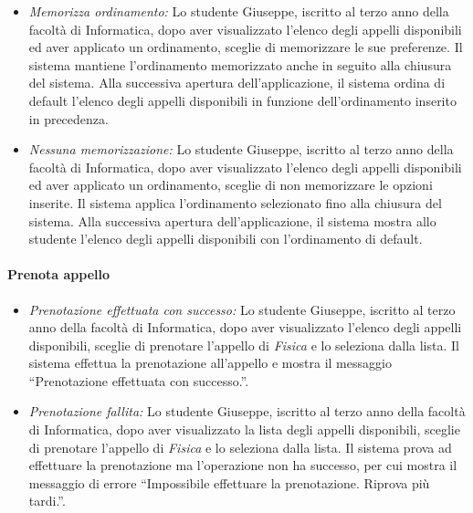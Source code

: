 \begin{itemize}
	\item \textit{Memorizza ordinamento:}
	Lo studente Giuseppe, iscritto al terzo anno della facoltà di Informatica, dopo aver visualizzato l’elenco degli appelli disponibili ed aver applicato un ordinamento, sceglie di memorizzare le sue preferenze. Il sistema mantiene l’ordinamento memorizzato anche in seguito alla chiusura del sistema. Alla successiva apertura dell’applicazione, il sistema ordina di default l’elenco degli appelli disponibili in funzione dell'ordinamento inserito in precedenza.
	
	\item \textit{Nessuna memorizzazione:}
	Lo studente Giuseppe, iscritto al terzo anno della facoltà di Informatica, dopo aver visualizzato l’elenco degli appelli disponibili ed aver applicato un ordinamento, sceglie di non memorizzare le opzioni inserite. Il sistema applica l’ordinamento selezionato fino alla chiusura del sistema. Alla successiva apertura dell'applicazione, il sistema mostra allo studente l’elenco degli appelli disponibili con l’ordinamento di default.
\end{itemize}

\paragraph{Prenota appello}
\begin{itemize}
	\item \textit{Prenotazione effettuata con successo:}
	Lo studente Giuseppe, iscritto al terzo anno della facoltà di Informatica, dopo aver visualizzato l'elenco degli appelli disponibili, sceglie di prenotare l’appello di \textit{Fisica} e lo seleziona dalla lista. Il sistema effettua la prenotazione all’appello e mostra il messaggio “Prenotazione effettuata con successo.”.
	
	\item \textit{Prenotazione fallita:}
	Lo studente Giuseppe, iscritto al terzo anno della facoltà di Informatica, dopo aver visualizzato la lista degli appelli disponibili, sceglie di prenotare l’appello di \textit{Fisica} e lo seleziona dalla lista. Il sistema prova ad effettuare la prenotazione ma l’operazione non ha successo, per cui mostra il messaggio di errore “Impossibile effettuare la prenotazione. Riprova più tardi.”.
\end{itemize}

